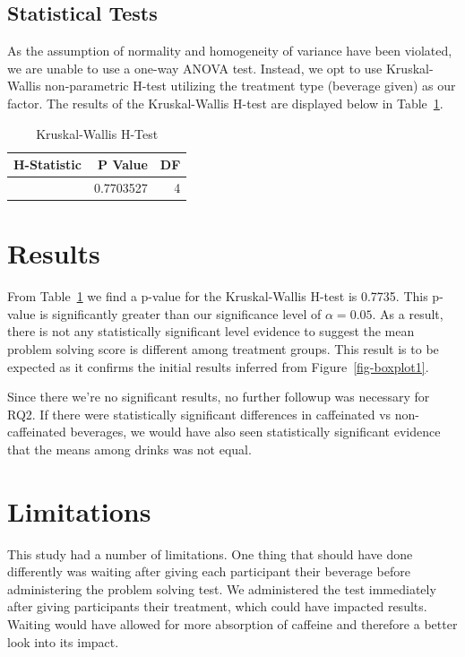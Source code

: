 \documentclass[
  letterpaper,
  DIV=11,
  numbers=noendperiod]{scrartcl}
\begin{document}
\subsection{Statistical Tests}\label{statistical-tests}

As the assumption of normality and homogeneity of variance have been
violated, we are unable to use a one-way ANOVA test. Instead, we opt to
use Kruskal-Wallis non-parametric H-test utilizing the treatment type
(beverage given) as our factor. The results of the Kruskal-Wallis H-test
are displayed below in Table~\ref{tbl-kwtest}.

\begin{longtable}[]{@{}rrr@{}}

\caption{\label{tbl-kwtest}Kruskal-Wallis H-Test}

\tabularnewline

\toprule\noalign{}
H-Statistic & P Value & DF \\
\midrule\noalign{}
\endhead
\bottomrule\noalign{}
\endlastfoot
1.811637 & 0.7703527 & 4 \\

\end{longtable}

\section{Results}\label{results}

From Table~\ref{tbl-kwtest} we find a p-value for the Kruskal-Wallis
H-test is 0.7735. This p-value is significantly greater than our
significance level of \(\alpha = 0.05\). As a result, there is not any
statistically significant level evidence to suggest the mean problem
solving score is different among treatment groups. This result is to be
expected as it confirms the initial results inferred from
Figure~\ref{fig-boxplot1}.

Since there we're no significant results, no further followup was
necessary for RQ2. If there were statistically significant differences
in caffeinated vs non-caffeinated beverages, we would have also seen
statistically significant evidence that the means among drinks was not
equal.

\section{Limitations}\label{limitations}

This study had a number of limitations. One thing that should have done
differently was waiting after giving each participant their beverage
before administering the problem solving test. We administered the test
immediately after giving participants their treatment, which could have
impacted results. Waiting would have allowed for more absorption of
caffeine and therefore a better look into its impact.
\end{document}
